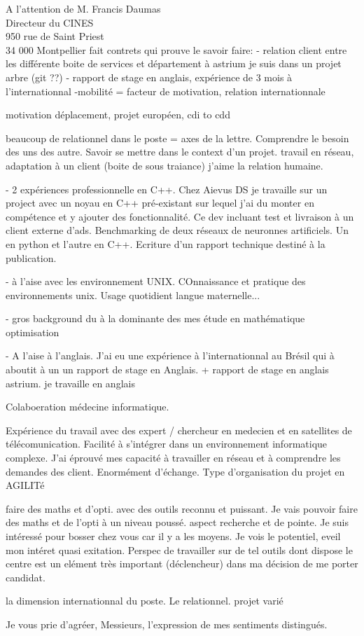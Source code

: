 \documentclass[12pt]{lettre}
\begin{document}
\begin{letter}{A l'attention de M. Francis Daumas\\Directeur du CINES\\950 rue de Saint Priest\\34 000 Montpellier}
fait contrets qui prouve le savoir faire:
- relation client entre les différente boite de services et département à astrium
je suis dans un projet arbre (git ??)
- rapport de stage en anglais, expérience de 3 mois à l'internationnal
-mobilité = facteur de motivation,  relation internationnale

motivation
déplacement, projet européen, cdi to cdd



beaucoup de relationnel dans le poste = axes de la lettre. Comprendre le besoin des uns des autre. Savoir se mettre dans le context d'un projet.
travail en réseau, adaptation à un client (boite de sous traiance) j'aime la relation humaine.

{
 - 2 expériences professionnelle en C++.
 Chez Aievus DS je travaille sur un project avec un noyau en C++ pré-existant sur lequel j'ai du monter en compétence et y ajouter des fonctionnalité. Ce dev incluant test et livraison à un client externe d'ads.
 Benchmarking de deux réseaux de neuronnes artificiels. Un en python et l'autre en C++. Ecriture d'un rapport technique destiné à la publication.

 - à l'aise avec les environnement UNIX. COnnaissance et pratique des environnements unix. Usage quotidient langue maternelle...

- gros background du à la dominante des mes étude en mathématique optimisation

 - A l'aise à l'anglais. J'ai eu une expérience à l'internationnal au Brésil qui à aboutit à un un rapport de stage en Anglais. + rapport de stage en anglais astrium. je travaille en anglais

 Colaboeration médecine informatique.

 Expérience du travail avec des expert / chercheur en medecien et en satellites de télécomunication. Facilité à s'intégrer dans un environnement informatique complexe. J'ai éprouvé mes capacité à travailler en réseau et à comprendre les demandes des client. Enormément d'échange. Type d'organisation du projet en AGILITé
}

{
 faire des maths et d'opti. avec des outils reconnu et puissant. Je vais pouvoir faire des maths et de l'opti à un niveau poussé. aspect recherche et de pointe. Je suis intéressé pour bosser chez vous car il y a les moyens. Je vois le potentiel, eveil mon intéret quasi exitation. Perspec de travailler sur de tel outils dont dispose le centre est un elément très important (déclencheur) dans ma décision de me porter candidat.

 la dimension internationnal du poste. Le relationnel. projet varié
}


\closing{Je vous prie d'agréer, Messieurs, l'expression de mes sentiments distingués.}
\end{letter}
\end{document}
